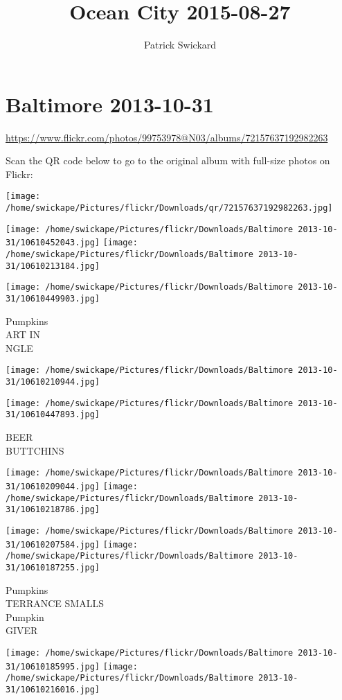 \documentclass[10pt,letterpaper]{article}
\title{Ocean City 2015-08-27}
\author{Patrick Swickard}
\date{}
\begin{document}
\section*{Baltimore 2013-10-31}

\url{https://www.flickr.com/photos/99753978@N03/albums/72157637192982263}

Scan the QR code below to go to the original album with full-size photos on Flickr:

\texttt{[image: /home/swickape/Pictures/flickr/Downloads/qr/72157637192982263.jpg]}
\pagebreak

\texttt{[image: /home/swickape/Pictures/flickr/Downloads/Baltimore 2013-10-31/10610452043.jpg]}
\texttt{[image: /home/swickape/Pictures/flickr/Downloads/Baltimore 2013-10-31/10610213184.jpg]}

\texttt{[image: /home/swickape/Pictures/flickr/Downloads/Baltimore 2013-10-31/10610449903.jpg]}

Pumpkins\\
ART IN\\
NGLE
\pagebreak

\texttt{[image: /home/swickape/Pictures/flickr/Downloads/Baltimore 2013-10-31/10610210944.jpg]}

\vspace{0.25in}
\texttt{[image: /home/swickape/Pictures/flickr/Downloads/Baltimore 2013-10-31/10610447893.jpg]}

BEER\\
BUTTCHINS
\pagebreak

\texttt{[image: /home/swickape/Pictures/flickr/Downloads/Baltimore 2013-10-31/10610209044.jpg]}
\texttt{[image: /home/swickape/Pictures/flickr/Downloads/Baltimore 2013-10-31/10610218786.jpg]}

\texttt{[image: /home/swickape/Pictures/flickr/Downloads/Baltimore 2013-10-31/10610207584.jpg]}
\texttt{[image: /home/swickape/Pictures/flickr/Downloads/Baltimore 2013-10-31/10610187255.jpg]}

Pumpkins\\
TERRANCE SMALLS\\
Pumpkin\\
GIVER
\pagebreak

\texttt{[image: /home/swickape/Pictures/flickr/Downloads/Baltimore 2013-10-31/10610185995.jpg]}
\texttt{[image: /home/swickape/Pictures/flickr/Downloads/Baltimore 2013-10-31/10610216016.jpg]}
\end{document}
